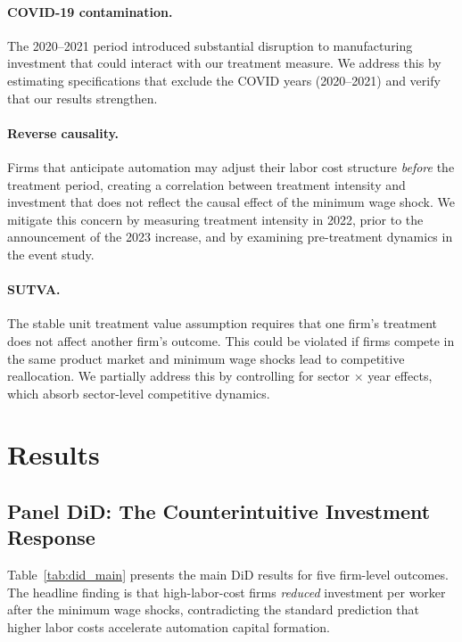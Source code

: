 \documentclass[5p,times,authoryear]{elsarticle}
\begin{document}
\paragraph{COVID-19 contamination.} The 2020--2021 period introduced substantial disruption to manufacturing investment that could interact with our treatment measure. We address this by estimating specifications that exclude the COVID years (2020--2021) and verify that our results strengthen.

\paragraph{Reverse causality.} Firms that anticipate automation may adjust their labor cost structure \emph{before} the treatment period, creating a correlation between treatment intensity and investment that does not reflect the causal effect of the minimum wage shock. We mitigate this concern by measuring treatment intensity in 2022, prior to the announcement of the 2023 increase, and by examining pre-treatment dynamics in the event study.

\paragraph{SUTVA.} The stable unit treatment value assumption requires that one firm's treatment does not affect another firm's outcome. This could be violated if firms compete in the same product market and minimum wage shocks lead to competitive reallocation. We partially address this by controlling for sector $\times$ year effects, which absorb sector-level competitive dynamics.

\FloatBarrier


\section{Results}
\label{sec:results}

\subsection{Panel DiD: The Counterintuitive Investment Response}
\label{subsec:results_did}

Table~\ref{tab:did_main} presents the main DiD results for five firm-level outcomes. The headline finding is that high-labor-cost firms \emph{reduced} investment per worker after the minimum wage shocks, contradicting the standard prediction that higher labor costs accelerate automation capital formation.
\end{document}
